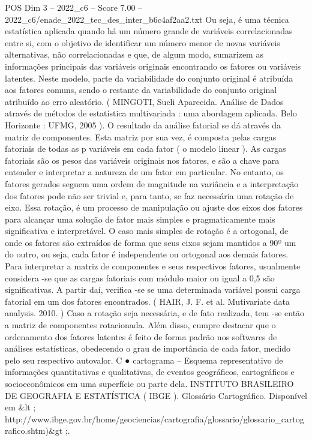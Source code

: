 \begin{textsample}{POS Dim 3 – 2022\_c6 – Score 7.00 – 2022\_c6/enade\_2022\_tec\_des\_inter\_b6c4af2aa2.txt}
Ou seja, é uma técnica estatística aplicada quando há um número grande de variáveis correlacionadas entre si, com o objetivo de identificar um número menor de novas variáveis alternativas, não correlacionadas e que, de algum modo, sumarizem as informações principais das variáveis originais encontrando os fatores ou variáveis latentes.
Neste modelo, parte da variabilidade do conjunto original é atribuída aos fatores comuns, sendo o restante da variabilidade do conjunto original atribuído ao erro aleatório. ( MINGOTI, Sueli Aparecida.
Análise de Dados através de métodos de estatística multivariada : uma abordagem aplicada.
Belo Horizonte : UFMG, 2005 ).
O resultado da análise fatorial se dá através da matriz de componentes.
Esta matriz por sua vez, é composta pelas cargas fatoriais de todas as p variáveis em cada fator ( o modelo linear ).
As cargas fatoriais são os pesos das variáveis originais nos fatores, e são a chave para entender e interpretar a natureza de um fator em particular.
No entanto, os fatores gerados seguem uma ordem de magnitude na variância e a interpretação dos fatores pode não ser trivial e, para tanto, se faz necessária uma rotação de eixo.
Essa rotação, é um processo de manipulação ou ajuste dos eixos dos fatores para alcançar uma solução de fator mais simples e pragmaticamente mais significativa e interpretável.
O caso mais simples de rotação é a ortogonal, de onde os fatores são extraídos de forma que seus eixos sejam mantidos a 90º um do outro, ou seja, cada fator é independente ou ortogonal aos demais fatores.
Para interpretar a matriz de componentes e seus respectivos fatores, usualmente considera -se que as cargas fatoriais com módulo maior ou igual a 0,5 são significativas.
A partir daí, verifica -se se uma determinada variável possui carga fatorial em um dos fatores encontrados. ( HAIR, J.
F. et al.
Mutivariate data analysis. 2010. ) Caso a rotação seja necessária, e de fato realizada, tem -se então a matriz de componentes rotacionada.
Além disso, cumpre destacar que o ordenamento dos fatores latentes é feito de forma padrão nos softwares de análises estatísticas, obedecendo o grau de importância de cada fator, medido pelo seu respectivo autovalor.
C {\EmojiFont ●} cartograma – Esquema representativo de informações quantitativas e qualitativas, de eventos geográficos, cartográficos e socioeconômicos em uma superfície ou parte dela.
INSTITUTO BRASILEIRO DE GEOGRAFIA E ESTATÍSTICA ( IBGE ).
Glossário Cartográfico.
Disponível em \&lt ; http://www.ibge.gov.br/home/geociencias/cartografia/glossario/glossario\_cartografico.shtm)\&gt ;.

\end{textsample}
